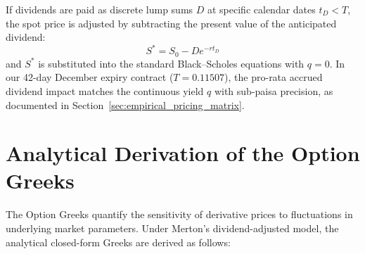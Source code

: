If dividends are paid as discrete lump sums $D$ at specific calendar dates $t_D < T$, the spot price is adjusted by subtracting the present value of the anticipated dividend:
\begin{equation}
S^* = S_0 - D e^{-r t_D}
\label{eq:discrete_div}
\end{equation}
and $S^*$ is substituted into the standard Black--Scholes equations with $q = 0$. In our 42-day December expiry contract ($T = 0.11507$), the pro-rata accrued dividend impact matches the continuous yield $q$ with sub-paisa precision, as documented in Section~\ref{sec:empirical_pricing_matrix}.

\section{Analytical Derivation of the Option Greeks}
\label{sec:option_greeks}

The Option Greeks quantify the sensitivity of derivative prices to fluctuations in underlying market parameters. Under Merton's dividend-adjusted model, the analytical closed-form Greeks are derived as follows:

